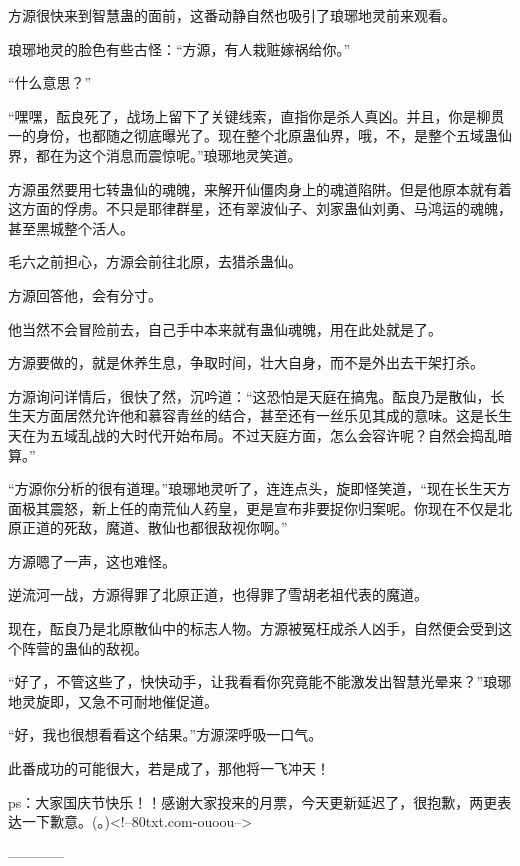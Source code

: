 \begin{this_body}
方源很快来到智慧蛊的面前，这番动静自然也吸引了琅琊地灵前来观看。

琅琊地灵的脸色有些古怪：“方源，有人栽赃嫁祸给你。”

“什么意思？”

“嘿嘿，酝良死了，战场上留下了关键线索，直指你是杀人真凶。并且，你是柳贯一的身份，也都随之彻底曝光了。现在整个北原蛊仙界，哦，不，是整个五域蛊仙界，都在为这个消息而震惊呢。”琅琊地灵笑道。

方源虽然要用七转蛊仙的魂魄，来解开仙僵肉身上的魂道陷阱。但是他原本就有着这方面的俘虏。不只是耶律群星，还有翠波仙子、刘家蛊仙刘勇、马鸿运的魂魄，甚至黑城整个活人。

毛六之前担心，方源会前往北原，去猎杀蛊仙。

方源回答他，会有分寸。

他当然不会冒险前去，自己手中本来就有蛊仙魂魄，用在此处就是了。

方源要做的，就是休养生息，争取时间，壮大自身，而不是外出去干架打杀。

方源询问详情后，很快了然，沉吟道：“这恐怕是天庭在搞鬼。酝良乃是散仙，长生天方面居然允许他和慕容青丝的结合，甚至还有一丝乐见其成的意味。这是长生天在为五域乱战的大时代开始布局。不过天庭方面，怎么会容许呢？自然会捣乱暗算。”

“方源你分析的很有道理。”琅琊地灵听了，连连点头，旋即怪笑道，“现在长生天方面极其震怒，新上任的南荒仙人药皇，更是宣布非要捉你归案呢。你现在不仅是北原正道的死敌，魔道、散仙也都很敌视你啊。”

方源嗯了一声，这也难怪。

逆流河一战，方源得罪了北原正道，也得罪了雪胡老祖代表的魔道。

现在，酝良乃是北原散仙中的标志人物。方源被冤枉成杀人凶手，自然便会受到这个阵营的蛊仙的敌视。

“好了，不管这些了，快快动手，让我看看你究竟能不能激发出智慧光晕来？”琅琊地灵旋即，又急不可耐地催促道。

“好，我也很想看看这个结果。”方源深呼吸一口气。

此番成功的可能很大，若是成了，那他将一飞冲天！

ps：大家国庆节快乐！！感谢大家投来的月票，今天更新延迟了，很抱歉，两更表达一下歉意。(。)<!--80txt.com-ouoou-->

------------

\end{this_body}

